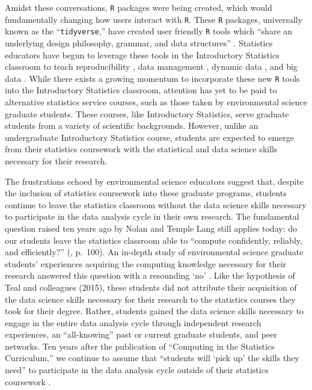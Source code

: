 \documentclass[12pt]{article}
\begin{document}
\quad Amidst these conversations, \texttt{R} packages were being created, which 
would fundamentally changing how users interact with \texttt{R}. These 
\texttt{R} packages, universally known as the ``\texttt{tidyverse},'' have 
created user friendly \texttt{R} tools which ``share an underlying design 
philosophy, grammar, and data structures'' \citep{tidyverse}. Statistics 
educators have begun to leverage these tools in the Introductory Statistics 
classroom to teach reproducibility \citep{mine-rmarkdown}, data management 
\citep{horton_takingachance}, dynamic data \citep{hardin-tise}, and big data
\citep{horton-tise}. While there exists a growing momentum to incorporate these
new \texttt{R} tools into the Introductory Statistics classroom, attention has 
yet to be paid to alternative statistics service courses, such as those taken 
by environmental science graduate students. These courses, like Introductory 
Statistics, serve graduate students from a variety of scientific backgrounds. 
However, unlike an undergraduate Introductory Statistics course, students are 
expected to emerge from their statistics coursework with the statistical and 
data science skills necessary for their research. 

\quad The frustrations echoed by environmental science educators 
\citep{hampton, datacarpentry} suggest that, despite the inclusion of statistics 
coursework into these graduate programs, students continue to leave the 
statistics classroom without the data science skills necessary to participate in 
the data analysis cycle in their own research. The fundamental question raised 
ten years ago by Nolan and Temple Lang still applies today: do our students
leave the statistics classroom able to ``compute confidently, reliably, and
efficiently?'' (\citeyear{nolan}, p.\ 100). An in-depth study of environmental 
science graduate students' experiences acquiring the computing knowledge
necessary for their research answered this question with a resounding `no' 
\citep{theobold}. Like the hypothesis of Teal and colleagues (2015), these
students did not attribute their acquisition of the data science skills
necessary for their research to the statistics courses they took for their
degree. Rather, students gained the data science skills necessary to engage in
the entire data analysis cycle through independent research experiences, an
``all-knowing'' past or current graduate students, and peer networks. Ten years 
after the publication of ``Computing in the Statistics Curriculum,'' we continue
to assume that ``students will `pick up' the skills they need'' to participate 
in the data analysis cycle outside of their statistics coursework 
\citep[p.\ 309]{gould}. 
\end{document}
